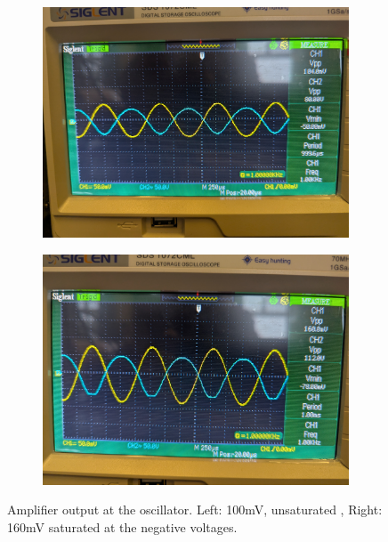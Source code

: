 \documentclass[12pt,a4paper]{article}
\begin{document}
\begin{figure}[H]
    \centering
    \begin{subfigure}[b]{0.48\linewidth}
        \centering
        \includegraphics[width=\linewidth]{unsaturated_100mv.jpg}
    \end{subfigure}\hfill
    \begin{subfigure}[b]{0.48\linewidth}
        \centering
        \includegraphics[width=\linewidth]{saturated_160mv.jpg}
    \end{subfigure}
    \caption{Amplifier output at the oscillator. Left: 100mV, unsaturated , Right: 160mV saturated at the negative voltages.}
    \label{fig:oscilloscope}
\end{figure}
\end{document}
